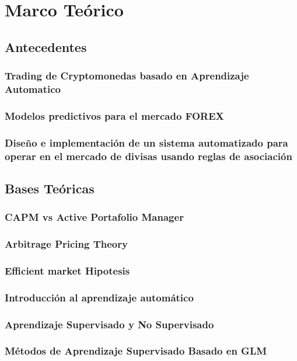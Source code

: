 \documentclass[a4paper,12pt]{Latex/Classes/PhDthesisPSnPDF}
\begin{document}
\chapter{Marco Teórico}

\section{Antecedentes}

\subsection{Trading de Cryptomonedas basado en Aprendizaje Automatico}

\subsection{Modelos predictivos para el mercado FOREX}

\subsection{Diseño e implementación de un sistema automatizado para operar en el mercado de divisas usando reglas de asociación}

\section{Bases Teóricas}

\subsection{CAPM vs Active Portafolio Manager}
\subsection{Arbitrage Pricing Theory}
\subsection{Efficient market Hipotesis}
\subsection{Introducción al aprendizaje automático}
\subsection{Aprendizaje Supervisado y No Supervisado}
\subsection{Métodos de Aprendizaje Supervisado Basado en GLM}
\end{document}

